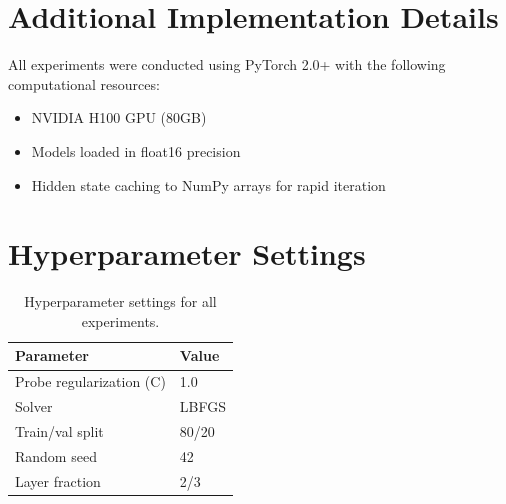 
\section{Additional Implementation Details}
\label{app:implementation}

All experiments were conducted using PyTorch 2.0+ with the following computational resources:
\begin{itemize}
\item NVIDIA H100 GPU (80GB)
\item Models loaded in float16 precision
\item Hidden state caching to NumPy arrays for rapid iteration
\end{itemize}

\section{Hyperparameter Settings}
\label{app:hyperparams}

\begin{table}[h]
\centering
\caption{Hyperparameter settings for all experiments.}
\begin{tabular}{@{}ll@{}}
\toprule
Parameter & Value \\
\midrule
Probe regularization (C) & 1.0 \\
Solver & LBFGS \\
Train/val split & 80/20 \\
Random seed & 42 \\
Layer fraction & 2/3 \\
\bottomrule
\end{tabular}
\end{table}
